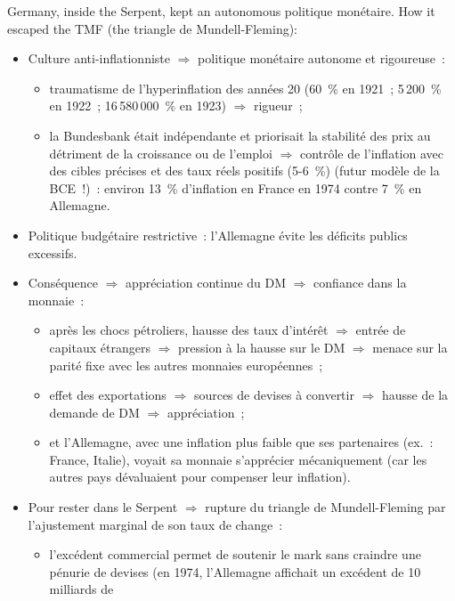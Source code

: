 Germany, inside the Serpent, kept an autonomous politique monétaire. How it escaped the
TMF (the triangle de Mundell-Fleming):
\begin{itemize}
  \item Culture anti-inflationniste $\Rightarrow$ politique monétaire autonome et
    rigoureuse~:
    \begin{itemize}
      \item traumatisme de l'hyperinflation des années 20 (60~\% en 1921~; 5\,200~\% en
        1922~; 16\,580\,000~\% en 1923) $\Rightarrow$ rigueur~;
      \item la Bundesbank était indépendante et priorisait la stabilité des prix au
        détriment de la croissance ou de l'emploi $\Rightarrow$ contrôle de l'inflation
        avec des cibles précises et des taux réels positifs (5-6~\%) (futur modèle de la
        BCE~!)~: environ 13~\% d'inflation en France en 1974 contre 7~\% en Allemagne.
    \end{itemize}
  \item Politique budgétaire restrictive~: l'Allemagne évite les déficits publics
    excessifs.
  \item Conséquence $\Rightarrow$ appréciation continue du DM $\Rightarrow$ confiance
    dans la monnaie~:
    \begin{itemize}
      \item après les chocs pétroliers, hausse des taux d'intérêt $\Rightarrow$ entrée
        de capitaux étrangers $\Rightarrow$ pression à la hausse sur le DM
        $\Rightarrow$ menace sur la parité fixe avec les autres monnaies européennes~;
      \item effet des exportations $\Rightarrow$ sources de devises à convertir
        $\Rightarrow$ hausse de la demande de DM $\Rightarrow$ appréciation~;
      \item et l'Allemagne, avec une inflation plus faible que ses partenaires (ex.~:
        France, Italie), voyait sa monnaie s'apprécier mécaniquement (car les autres
        pays dévaluaient pour compenser leur inflation).
    \end{itemize}
  \item Pour rester dans le Serpent $\Rightarrow$ rupture du triangle de Mundell-Fleming
    par l'ajustement marginal de son taux de change~:
    \begin{itemize}
      \item l'excédent commercial permet de soutenir le mark sans craindre une pénurie
        de devises (en 1974, l'Allemagne affichait un excédent de 10 milliards de

\end{itemize}
\end{itemize}
